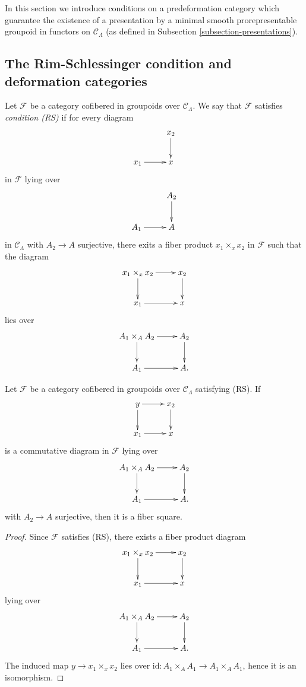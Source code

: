 \noindent
In this section we introduce conditions on a predeformation category which 
guarantee the existence of a presentation by a minimal smooth prorepresentable 
groupoid in functors on $\mathcal{C}_\Lambda$ (as defined in
Subsection \ref{subsection-presentations}).

\subsection{The Rim-Schlessinger condition and deformation categories}
\label{subsection-RS-condition}

\begin{definition}
\label{definition-RS}
Let $\mathcal{F}$ be a category cofibered in groupoids over $\mathcal 
C_\Lambda$.  We say that $\mathcal{F}$ satisfies {\it condition (RS)}
if for every diagram
\[
\xymatrix{
           & x_2 \ar[d] \\
x_1 \ar[r] & x   
}
\]
in $\mathcal{F}$ lying over
\[
\xymatrix{
           & A_2 \ar[d] \\
A_1 \ar[r] & A   
}
\]  
in $\mathcal{C}_\Lambda$ with $A_2 \to A$ surjective, there exits a 
fiber product $x_1 \times_{x} x_2$ in $\mathcal{F}$ such that the diagram
\[
\xymatrix{
x_1 \times_{x} x_2 \ar[r] \ar[d] & x_2 \ar[d] \\
x_1 \ar[r]      & x   
}
\]
lies over
\[
\xymatrix{
A_1 \times_{A} A_2 \ar[r] \ar[d] & A_2 \ar[d] \\
A_1 \ar[r]      & A.   
}
\]
\end{definition}

\begin{lemma}
\label{lemma-RS-fiber-square}
Let $\mathcal{F}$ be a category cofibered in groupoids over $\mathcal 
C_\Lambda$ satisfying (RS).  If
\[
\xymatrix{
y \ar[r] \ar[d] & x_2 \ar[d]   \\
x_1 \ar[r]      & x  
}
\]
is a commutative diagram in $\mathcal{F}$ lying over
\[
\xymatrix{
A_1 \times_{A} A_2 \ar[r] \ar[d] & A_2 \ar[d] \\
A_1 \ar[r]      & A.   
}
\]
with $A_2 \to A$ surjective, then it is a fiber square.
\end{lemma}

\begin{proof}
Since $\mathcal{F}$ satisfies (RS), there exists a fiber product diagram
\[
\xymatrix{
x_1 \times_{x} x_2 \ar[r] \ar[d] & x_2 \ar[d] \\
x_1 \ar[r]      & x   
}
\]
lying over 
\[
\xymatrix{
A_1 \times_{A} A_2 \ar[r] \ar[d] & A_2 \ar[d] \\
A_1 \ar[r]      & A.   
}
\]
The induced map $y \to x_1 \times_{x} x_2$ lies over $\text{id}: 
A_1 \times_{A} A_1 \to A_1 \times_{A} A_1$, hence it is an isomorphism.
\end{proof}

